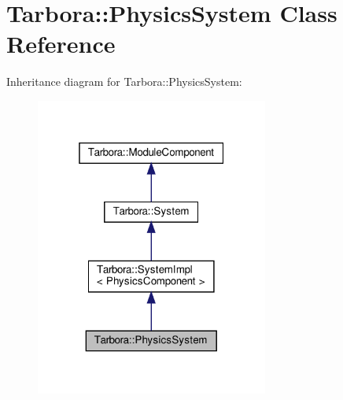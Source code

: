 \hypertarget{classTarbora_1_1PhysicsSystem}{}\section{Tarbora\+:\+:Physics\+System Class Reference}
\label{classTarbora_1_1PhysicsSystem}


Inheritance diagram for Tarbora\+:\+:Physics\+System\+:
\nopagebreak
\begin{figure}[H]
\begin{center}
\leavevmode
\includegraphics[width=217pt]{classTarbora_1_1PhysicsSystem__inherit__graph}
\end{center}
\end{figure}


